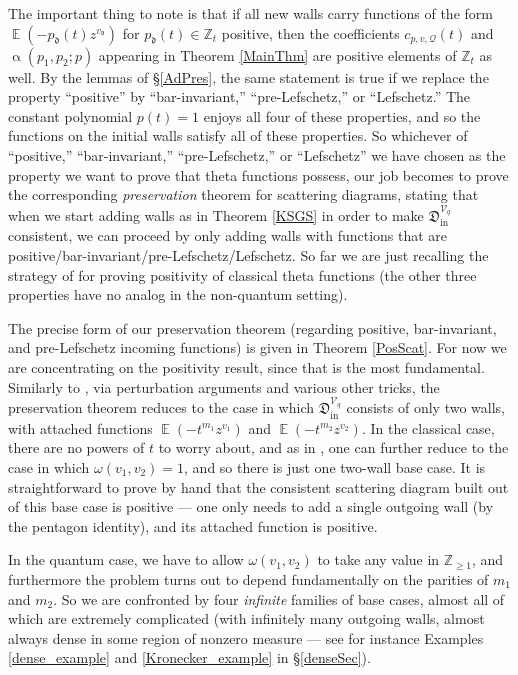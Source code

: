 \documentclass{amsart}
\DeclareMathOperator{\In}{in}
\DeclareMathOperator{\EE}{\mathbb{E}}
\let\f=\mathfrak
\let\s=\mathcal
\newcommand {\Zt} {\Z_t}
\newcommand {\sQ} {\mathcal{Q}}
\renewcommand{\alpha}{\upalpha}
\theoremstyle{plain}%
\newcommand{\Z}{{\mathbb Z}}
\theoremstyle{definition}
\theoremstyle{remark}
\begin{document}
The important thing to note is that if all new walls carry functions of the form $\EE(-p_{\f{d}}(t)z^{v_{\f{d}}})$ for $p_{\f{d}}(t)\in \Zt$ positive, then the coefficients $c_{p,v,\sQ}(t)$ and $\alpha(p_1,p_2;p)$ appearing in Theorem \ref{MainThm} are positive elements of $\Zt$ as well.  By the lemmas of \S \ref{AdPres}, the same statement is true if we replace the property ``positive'' by ``bar-invariant,'' ``pre-Lefschetz,''  or ``Lefschetz.''  The constant polynomial $p(t)=1$ enjoys all four of these properties, and so the functions on the initial walls satisfy all of these properties.  So whichever of ``positive,'' ``bar-invariant,'' ``pre-Lefschetz,'' or ``Lefschetz'' we have chosen as the property we want to prove that theta functions possess, our job becomes to prove the corresponding \textit{preservation} theorem for scattering diagrams, stating that when we start adding walls as in Theorem \ref{KSGS} in order to make $\f{D}_{\In}^{\s{V}_q}$ consistent, we can proceed by only adding walls with functions that are positive/bar-invariant/pre-Lefschetz/Lefschetz.  So far we are just recalling the strategy of \cite{GHKK} for proving positivity of classical theta functions (the other three properties have no analog in the non-quantum setting).  

The precise form of our preservation theorem (regarding positive, bar-invariant, and pre-Lefschetz incoming functions) is given in Theorem \ref{PosScat}.  For now we are concentrating on the positivity result, since that is the most fundamental.  Similarly to \cite[\S C.3]{GHKK}, via perturbation arguments and various other tricks, the preservation theorem reduces to the case in which $\f{D}^{\s{V}_q}_{\In}$ consists of only two walls, with attached functions $\EE(-t^{m_1}z^{v_1})$ and $\EE(-t^{m_2}z^{v_2})$.  In the classical case, there are no powers of $t$ to worry about, and as in \cite[\S C.3, Step IV]{GHKK}, one can further reduce to the case in which $\omega(v_1,v_2)=1$, and so there is just one two-wall base case.  It is straightforward to prove by hand that the consistent scattering diagram built out of this base case is positive --- one only needs to add a single outgoing wall (by the pentagon identity), and its attached function is positive.  

In the quantum case, we have to allow $\omega(v_1,v_2)$ to take any value in $\mathbb{Z}_{\geq 1}$, and furthermore the problem turns out to depend fundamentally on the parities of $m_1$ and $m_2$.  So we are confronted by four \textit{infinite} families of base cases, almost all of which are extremely complicated (with infinitely many outgoing walls, almost always dense in some region of nonzero measure --- see for instance Examples \ref{dense_example} and \ref{Kronecker_example} in \S \ref{denseSec}).
\end{document}
